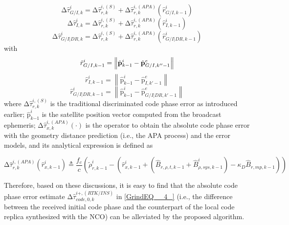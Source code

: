 \documentclass{article}
\begin{document}
\begin{equation}\label{GrindEQ__12_}
\mathrm{\Delta }{\hat{\tau }}^i_{G/I,k}=\mathrm{\Delta }{\hat{\tau }}^{i,\left(S\right)}_{r,k}+\mathrm{\Delta }{\hat{\tau }}^{i,\left(APA\right)}_{r,k}\left({\hat{r}}^i_{G/I,k-1}\right)
\end{equation}
\begin{equation}\label{GrindEQ__13_}
\mathrm{\Delta }{\hat{\tau }}^i_{I,k}=\mathrm{\Delta }{\hat{\tau }}^{i,\left(S\right)}_{r,k}+\mathrm{\Delta }{\hat{\tau }}^{i,\left(APA\right)}_{r,k}\left({\hat{r}}^i_{I,k-1}\right)
\end{equation}
\begin{equation}\label{GrindEQ__14_}
\mathrm{\Delta }{\hat{\tau }}^i_{G/I|DR,k}=\mathrm{\Delta }{\hat{\tau }}^{i,\left(S\right)}_{r,k}+\mathrm{\Delta }{\hat{\tau }}^{i,\left(APA\right)}_{r,k}\left({\hat{r}}^i_{G/I|DR,k-1}\right)
\end{equation}
with
\[\hat r_{G/I,k - 1}^i = \left\| {{\hat{\bf{ p}}}_{k - {\rm{1}}}^i - {\hat{\bf{p}}}_{G/I,k'' - 1}^e} \right\|\]
\[{\hat{r}}^i_{I,k-1}=\left\|{\hat{\boldsymbol{\mathrm{p}}}}^i_{k\boldsymbol{-}\mathrm{1}}-{\hat{\boldsymbol{\mathrm{p}}}}^e_{I,k'-1}\right\|\] 
\[{\hat{r}}^i_{G/I|DR,k-1}=\left\|{\hat{\boldsymbol{\mathrm{p}}}}^i_{k\boldsymbol{-}\mathrm{1}}-{\hat{\boldsymbol{\mathrm{p}}}}^e_{G/I|DR,k'-1}\right\|\] 
where $\mathrm{\Delta }{\hat{\tau }}^{i,(S)}_{r,k}$ is the traditional discriminated code phase error as introduced earlier; ${\hat{\boldsymbol{\mathrm{p}}}}^i_{k\boldsymbol{-}\mathrm{1}}$ is the satellite position vector computed from the broadcast ephemeris; $\mathrm{\Delta }{\hat{\tau }}^{i,\left(APA\right)}_{x,k}\left(\cdot \right)$ is the operator to obtain the absolute code phase error with the geometry distance prediction (i.e., the APA process) and the error models, and its analytical expression is defined as 

\begin{equation}\label{GrindEQ__15_}
\mathrm{\Delta }{\hat{\tau }}^{i,\left(APA\right)}_{r,k}\left({\hat{r}}^i_{x,k-1}\right)\triangleq \frac{f_c}{c}\left({\tilde{\rho }}^i_{r,k-1}-\left({\hat{r}}^i_{x,k-1}+\left({\hat{B}}_{r,\rho ,t,k-1}+{\hat{B}}^i_{\rho ,sys,k-1}\right)-{\kappa }_D{\hat{B}}_{r,mp,k-1}\right)\right)
\end{equation}

Therefore, based on these discussions, it is easy to find that the absolute code phase error estimate $\mathrm{\Delta }{\hat{\tau }}^{i+,\left(RTK/INS\right)}_{code,0,k}$ in \eqref{GrindEQ__4_} (i.e., the difference between the received initial code phase and the counterpart of the local code replica synthesized with the NCO) can be alleviated by the proposed algorithm. 
\end{document}
